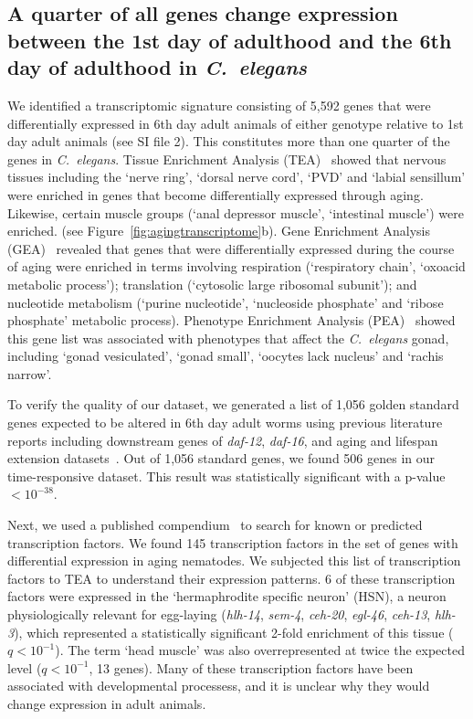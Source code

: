 \documentclass[9pt,twocolumn,twoside]{gsag3jnl}
\newcommand{\cel}{\emph{C.~elegans}}
\newcommand{\gene}[1]{\emph{\mbox{#1}}}
\newcommand{\agen}{5,592}
\newcommand{\tfaging}{145}
\newcommand{\goldn}{1,056}
\newcommand{\goldfound}{506}
\newcommand{\goldpval}{$<10^{-38}$}
\begin{document}
\subsection*{A quarter of all genes change expression between the 1st day of
             adulthood and the 6th day of adulthood in \cel{}}
We identified a transcriptomic signature consisting of \agen{} genes that were
differentially expressed in 6th day adult animals of either genotype relative
to 1st day adult animals (see SI file 2). This constitutes more than one quarter
of the genes in \cel{}. Tissue Enrichment Analysis (TEA)~\citep{Angeles-Albores2016}
showed that nervous tissues including the `nerve ring', `dorsal nerve cord', `PVD'
and `labial sensillum' were enriched in genes that become differentially expressed
through aging. Likewise, certain muscle groups (`anal depressor muscle', `intestinal
muscle') were enriched. (see Figure~\ref{fig:agingtranscriptome}b). Gene
Enrichment Analysis (GEA)~\citep{Angeles-Albores106369} revealed that genes that
were differentially expressed during the course of aging were enriched in terms
involving respiration (`respiratory chain', `oxoacid metabolic process');
translation (`cytosolic large ribosomal subunit'); and nucleotide metabolism
(`purine nucleotide', `nucleoside phosphate' and `ribose phosphate' metabolic
process). Phenotype Enrichment Analysis (PEA)~\citep{Angeles-Albores106369} showed
this gene list was associated with phenotypes that affect the \cel{} gonad,
including `gonad vesiculated', `gonad small', `oocytes lack nucleus' and
`rachis narrow'.

To verify the quality of our dataset, we generated a list of \goldn{} golden
standard genes expected to be altered in 6th day adult worms using previous
literature reports including downstream genes of \gene{daf-12}, \gene{daf-16},
and aging and lifespan extension datasets~\citep{Murphy2003,Halaschek-wiener2005,
Lund2002,McCormick2012,Eckley2013}. Out of \goldn{} standard genes, we found
\goldfound{} genes in our time-responsive dataset. This result was statistically
significant with a p-value \goldpval{}.

Next, we used a published compendium~\citep{Reece-Hoyes2005} to search for known
or predicted transcription factors. We found \tfaging{} transcription factors in
the set of genes with differential expression in aging nematodes. We subjected
this list of transcription factors to TEA to understand their expression
patterns. 6 of these transcription factors were expressed in the `hermaphrodite
specific neuron' (HSN), a neuron physiologically relevant for egg-laying
(\gene{hlh-14}, \gene{sem-4}, \gene{ceh-20}, \gene{egl-46}, \gene{ceh-13},
\gene{hlh-3}), which represented a statistically significant 2-fold enrichment of
this tissue ($q<10^{-1}$). The term `head muscle' was also overrepresented at
twice the expected level ($q<10^{-1}$, 13 genes). Many of these transcription
factors have been  associated with developmental processess, and it is unclear
why they would change expression in adult animals.
\end{document}
